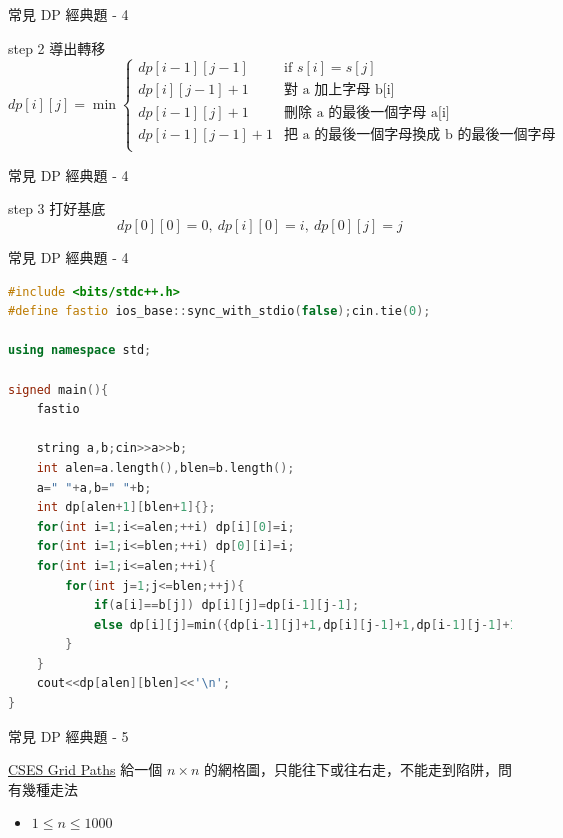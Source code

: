 \documentclass[aspectratio=169]{beamer}
\begin{document}
    \begin{frame}{常見 DP 經典題 - 4}
        \begin{block}{step 2 導出轉移}
            $$
            dp[i][j]= \min
            \begin{cases}
                dp[i-1][j-1]         & \text{if } s[i]=s[j] \\
                dp[i][j-1]+1         & \text{對 a 加上字母 b[i]} \\
                dp[i-1][j]+1         & \text{刪除 a 的最後一個字母 a[i]} \\
                dp[i-1][j-1]+1       & \text{把 a 的最後一個字母換成 b 的最後一個字母} \\
            \end{cases}
            $$
        \end{block}
    \end{frame}

    \begin{frame}{常見 DP 經典題 - 4}
        \begin{block}{step 3 打好基底}
            $$dp[0][0] = 0, \ dp[i][0] = i, \ dp[0][j] = j$$
        \end{block}
    \end{frame}

    \begin{frame}[fragile]{常見 DP 經典題 - 4}
        \begin{lstlisting}[language=C++, basicstyle=\ttfamily\tiny]
#include <bits/stdc++.h>
#define fastio ios_base::sync_with_stdio(false);cin.tie(0);

using namespace std;

signed main(){
    fastio
 
    string a,b;cin>>a>>b;
    int alen=a.length(),blen=b.length();
    a=" "+a,b=" "+b;
    int dp[alen+1][blen+1]{};
    for(int i=1;i<=alen;++i) dp[i][0]=i;
    for(int i=1;i<=blen;++i) dp[0][i]=i;
    for(int i=1;i<=alen;++i){
        for(int j=1;j<=blen;++j){
            if(a[i]==b[j]) dp[i][j]=dp[i-1][j-1];
            else dp[i][j]=min({dp[i-1][j]+1,dp[i][j-1]+1,dp[i-1][j-1]+1});
        }
    }
    cout<<dp[alen][blen]<<'\n';
}
        \end{lstlisting}
    \end{frame}

    \begin{frame}{常見 DP 經典題 - 5}
        \begin{block}{\href{https://cses.fi/problemset/task/1638}{CSES Grid Paths}}
            給一個 $n \times n$ 的網格圖，只能往下或往右走，不能走到陷阱，問有幾種走法 \\
            \vspace{2.5mm}
            \begin{itemize}
                \item $1 \leq n \leq 1000$
            \end{itemize}
        \end{block}
    \end{frame}
\end{document}

